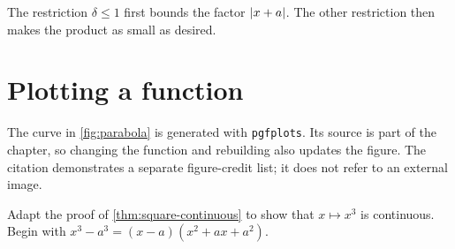 \documentclass[../../main.tex]{subfiles}
\begin{document}
\begin{intuition}
The restriction $\delta\le1$ first bounds the factor $\left\lvert x+a \right\rvert$. The other
restriction then makes the product as small as desired.
\end{intuition}

\clearpage
\section{Plotting a function}
\begin{figure}[H]
  \vspace{0pt}
  \centering
\end{figure}
The curve in \cref{fig:parabola} is generated with \texttt{pgfplots}. Its
source is part of the chapter, so changing the function and rebuilding also
updates the figure. The citation demonstrates a separate figure-credit list;
it does not refer to an external image.

\begin{exercise}\label{ex:cubic-estimate}
Adapt the proof of \cref{thm:square-continuous} to show that $x\mapsto x^3$
is continuous. Begin with $x^3-a^3=(x-a)(x^2+ax+a^2)$.
\end{exercise}
\end{document}
